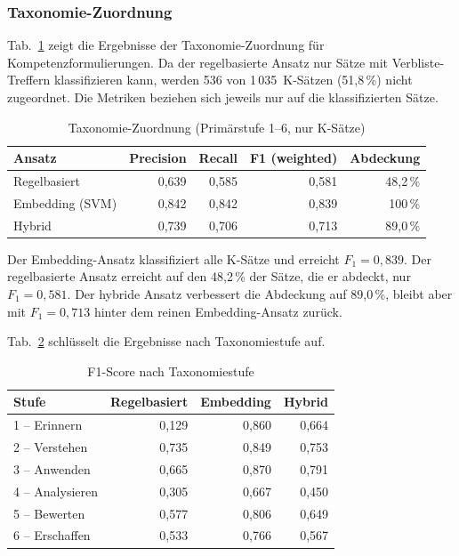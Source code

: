 \subsubsection{Taxonomie-Zuordnung}\label{sec:eval-taxonomie}

Tab.~\ref{tab:eval-taxonomie} zeigt die Ergebnisse der Taxonomie-Zuordnung für Kompetenzformulierungen.
Da der regelbasierte Ansatz nur Sätze mit Verbliste-Treffern klassifizieren kann, werden 536 von 1\,035~K-Sätzen (51{,}8\,\%) nicht zugeordnet.
Die Metriken beziehen sich jeweils nur auf die klassifizierten Sätze.

\begin{table}[H]
\caption{Taxonomie-Zuordnung (Primärstufe 1--6, nur K-Sätze)\label{tab:eval-taxonomie}}
\centering
\begin{tabular}{lrrrr}
\hline
\textbf{Ansatz} & \textbf{Precision} & \textbf{Recall} & \textbf{F1 (weighted)} & \textbf{Abdeckung} \\
\hline
Regelbasiert & 0{,}639 & 0{,}585 & 0{,}581 & 48{,}2\,\% \\
Embedding (SVM) & 0{,}842 & 0{,}842 & 0{,}839 & 100\,\% \\
Hybrid & 0{,}739 & 0{,}706 & 0{,}713 & 89{,}0\,\% \\
\hline
\end{tabular}
\end{table}

Der Embedding-Ansatz klassifiziert alle K-Sätze und erreicht $F_1 = 0{,}839$.
Der regelbasierte Ansatz erreicht auf den 48{,}2\,\% der Sätze, die er abdeckt, nur $F_1 = 0{,}581$.
Der hybride Ansatz verbessert die Abdeckung auf 89{,}0\,\%, bleibt aber mit $F_1 = 0{,}713$ hinter dem reinen Embedding-Ansatz zurück.

Tab.~\ref{tab:eval-taxonomie-detail} schlüsselt die Ergebnisse nach Taxonomiestufe auf.

\begin{table}[H]
\caption{F1-Score nach Taxonomiestufe\label{tab:eval-taxonomie-detail}}
\centering
\begin{tabular}{lrrr}
\hline
\textbf{Stufe} & \textbf{Regelbasiert} & \textbf{Embedding} & \textbf{Hybrid} \\
\hline
1 -- Erinnern & 0{,}129 & 0{,}860 & 0{,}664 \\
2 -- Verstehen & 0{,}735 & 0{,}849 & 0{,}753 \\
3 -- Anwenden & 0{,}665 & 0{,}870 & 0{,}791 \\
4 -- Analysieren & 0{,}305 & 0{,}667 & 0{,}450 \\
5 -- Bewerten & 0{,}577 & 0{,}806 & 0{,}649 \\
6 -- Erschaffen & 0{,}533 & 0{,}766 & 0{,}567 \\
\hline
\end{tabular}
\end{table}


